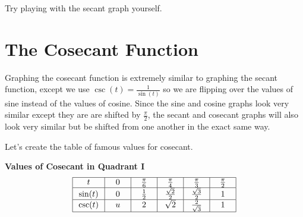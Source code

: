 \documentclass[nooutcomes, noauthor]{ximera}
\begin{document}
Try playing with the secant graph yourself.

\begin{center}  
\end{center} 


\section{The Cosecant Function}

Graphing the cosecant function is extremely similar to graphing the secant function, except we use $\csc(t)=\frac{1}{\sin(t)}$ so we are flipping over the values of sine instead of the values of cosine.  Since the sine and cosine graphs look very similar except they are are shifted by $\frac{\pi}{2}$, the secant and cosecant graphs will also look very similar but be shifted from one another in the exact same way.  

Let's create the table of famous values for cosecant.

\begin{center}
\textbf{Values of Cosecant in Quadrant I}
\renewcommand*{\arraystretch}{2.5}
\setlength{\arrayrulewidth}{0.5mm}
\setlength{\tabcolsep}{18pt}
\[
\begin{array}{|>{\centering\arraybackslash$} p{1cm} <{$} | >{\centering\arraybackslash$} p{.75cm} <{$} |  >{\centering\arraybackslash$} p{.75cm} <{$} |  >{\centering\arraybackslash$} p{.75cm} <{$} |  >{\centering\arraybackslash$} p{.75cm} <{$} |  >{\centering\arraybackslash$} p{.75cm} <{$} |}
\hline 
t & 0 & \frac{\pi}{6} & \frac{\pi}{4} & \frac{\pi}{3} & \frac{\pi}{2}\\
\hline
\sin(t) & 0 & \frac{1}{2} &\frac{\sqrt{2}}{2} & \frac{\sqrt{3}}{2} & 1\\
\hline
\csc(t) & u & 2& \sqrt{2} & \frac{2}{\sqrt{3}}& 1\\
\hline 
\end{array}
\]
\end{center}
\end{document}
